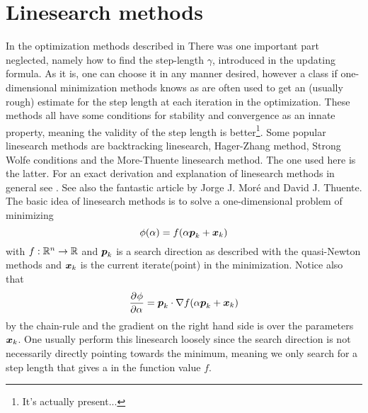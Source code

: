 \section{Linesearch methods\label{sec:linesearch_methods}}
    In the optimization methods described in
     There was one important
    part neglected, namely how to find the step-length $\gamma$, introduced in
    the updating formula. As it is, one can choose it in any manner desired,
    however a class if one-dimensional minimization methods knows as
     are often used to get an (usually rough)
    estimate for the step length at each iteration in the optimization. These
    methods all have some conditions for stability and convergence as an innate
    property, meaning the validity of the step length is better\footnote{It's
    actually present...}. Some popular linesearch methods are backtracking
    linesearch, Hager-Zhang method, Strong Wolfe conditions and the
    More-Thuente linesearch method. The one used here is the latter.  For an
    exact derivation and explanation of linesearch methods in general see
    \cite{numOptNocWrig}. See also the fantastic article by Jorge J.  Mor{\'e}
    and David J. Thuente\cite{moreThuenteArticle}. \\
    The basic idea of linesearch methods is to solve a one-dimensional problem
    of minimizing
        \begin{equation}
            \phi(\alpha) = f(\alpha \boldsymbol{{p}}_k + \boldsymbol{{x}}_k)
        \end{equation}
    with $f:\mathbb{R}^n\rightarrow\mathbb{R}$ and $\boldsymbol{{p}}_k$ is a search direction
    as described with the quasi-Newton methods and $\boldsymbol{{x}}_k$ is the current
    iterate(point) in the minimization. Notice also that
        \begin{equation}
            \prd{\alpha}[\phi] = \blds{p}_k \cdot \nabla f(\alpha \blds{p}_k +
            \blds{x}_k)
        \end{equation}
    by the chain-rule and the gradient on the right hand side is over the
    parameters $\boldsymbol{{x}}_k$. One usually perform this linesearch loosely since
    the search direction is not necessarily directly pointing towards the
    minimum, meaning we only search for a step length that gives a
     in the function value $f$.

